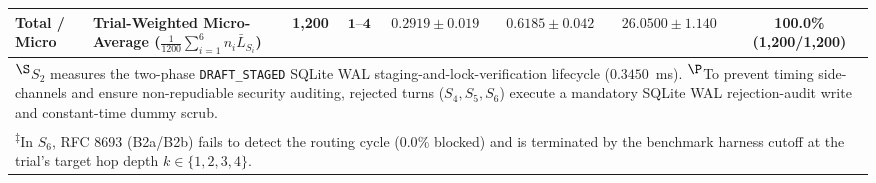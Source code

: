 \documentclass[conference,10pt]{IEEEtran}
\begin{document}
\begin{table}[t]
{\begin{tabular}{llrrcccc}
\midrule
\textbf{Total / Micro} & \textbf{Trial-Weighted Micro-Average ($\frac{1}{1200}\sum_{i=1}^6 n_i \bar{L}_{S_i}$)} & \textbf{1,200} & $\mathbf{1\text{--}4}$ & $\mathbf{0.2919 \pm 0.019}$ & $\mathbf{0.6185 \pm 0.042}$ & $\mathbf{26.0500 \pm 1.140}$ & \textbf{100.0\% (1,200/1,200)} \\
\bottomrule
\multicolumn{8}{l}{\tiny \textsuperscript{$\S$}$S_2$ measures the two-phase \texttt{DRAFT\_STAGED} SQLite WAL staging-and-lock-verification lifecycle ($0.3450$~ms). \textsuperscript{$\P$}To prevent timing side-channels and ensure non-repudiable security auditing, rejected turns ($S_4, S_5, S_6$) execute a mandatory SQLite WAL rejection-audit write and constant-time dummy scrub.} \\
\multicolumn{8}{l}{\tiny \textsuperscript{$\ddagger$}In $S_6$, RFC 8693 (B2a/B2b) fails to detect the routing cycle ($0.0\%$ blocked) and is terminated by the benchmark harness cutoff at the trial's target hop depth $k \in \{1, 2, 3, 4\}$.}
\end{tabular}%
}
\end{table}
\end{document}
